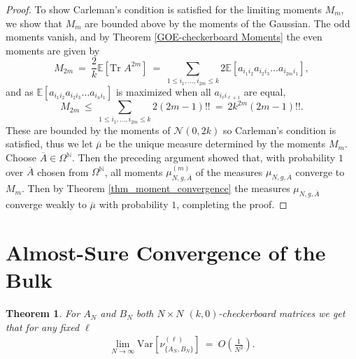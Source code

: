\documentclass[11pt,reqno]{amsart}
\numberwithin{equation}{section}
\theoremstyle{plain}
\newtheorem{theorem}[thm]{Theorem}
\newcommand{\N}{\mathbb{N}}
\newcommand{\E}[1]{\mathbb{E}[#1]}
\begin{document}
\begin{proof}
To show Carleman's condition is satisfied for the limiting moments $M_m$, we show that $M_m$ are bounded above by the moments of the Gaussian. The odd moments vanish, and by Theorem \ref{GOE-checkerboard Moments} the even moments are given by
\begin{equation}
M_{2m}\ =\ \frac{2}{k} \E{\text{Tr } A^{2m}}\ =\ \sum_{1 \leq i_1,\ldots,i_{2m} \leq k} 2\E{a_{i_1i_2}a_{i_2i_3}\ldots a_{i_{2m}i_1}},
\end{equation} and as
$\E{a_{i_1i_2}a_{i_2i_3}\ldots a_{i_ni_1}}$ is maximized when all $a_{i_{\ell}i_{\ell+1}}$ are equal,
\begin{equation}
M_{2m}\ \leq\  \sum_{1 \leq i_1,\ldots,i_{2m} \leq k} 2(2m-1)!!\ =\ 2k^{2m}(2m-1)!!.
\end{equation}
These are bounded by the moments of $\mathcal{N}(0,2k)$ so Carleman's condition is satisfied, thus we let $\overline{\mu}$ be the unique measure determined by the moments $M_m$. Choose $\overline{A} \in \Omega^\N$. Then the preceding argument showed that, with probability $1$ over $\overline{A}$ chosen from $\Omega^\N$, all moments $\mu_{N,g,\overline{A}}^{(m)}$ of the measures $\mu_{N,g,\overline{A}}$ converge to $M_m$. Then by Theorem \ref{thm_moment_convergence} the measures $\mu_{N,g,\overline{A}}$ converge weakly to $\overline{\mu}$ with probability $1$, completing the proof.
\end{proof}

\section{Almost-Sure Convergence of the Bulk}

\begin{theorem}\label{checkerboard convergence} For $A_N$ and $B_N$ both $N\times N$ $(k,0)$-checkerboard matrices we get that for any fixed $\ell$
\begin{align}
\lim_{N\to\infty}\text{Var}[\nu_{\{A_N,B_N\}}^{(\ell)}]\ = \ O\left(\frac{1}{N^2}\right).
\end{align}
\end{theorem}
\end{document}
